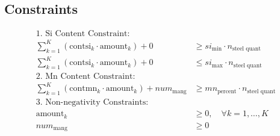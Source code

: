 \documentclass{article}
\begin{document}
\subsection*{Constraints}
\begin{align*}
\text{1. Si Content Constraint:} \\
\sum_{k=1}^{K} (\text{contsi}_k \cdot \text{amount}_k) + 0 & \geq si_{\text{min}} \cdot n_{\text{steel quant}} \\
\sum_{k=1}^{K} (\text{contsi}_k \cdot \text{amount}_k) + 0 & \leq si_{\text{max}} \cdot n_{\text{steel quant}} \\

\text{2. Mn Content Constraint:} \\
\sum_{k=1}^{K} (\text{contmn}_k \cdot \text{amount}_k) + num_{\text{mang}} & \geq mn_{\text{percent}} \cdot n_{\text{steel quant}} \\

\text{3. Non-negativity Constraints:} \\
\text{amount}_k & \geq 0, \quad \forall k = 1, \ldots, K \\
num_{\text{mang}} & \geq 0 
\end{align*}
\end{document}
